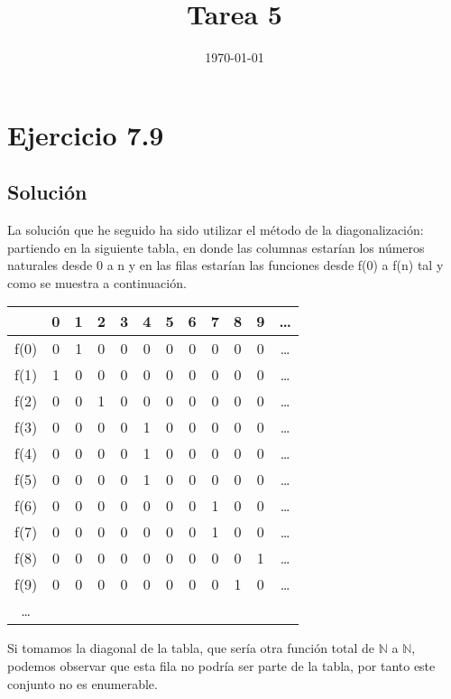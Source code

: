 \documentclass[11pt, a4paper, titlepage]{article}
\begin{document}
\title{Tarea 5}
\date{\today}
\maketitle
\newpage

\section*{Ejercicio 7.9}
\subsection*{Solución}
La solución que he seguido ha sido utilizar el método de la diagonalización:
partiendo en la siguiente tabla, en donde las columnas estarían los números
naturales desde 0 a n y en las filas estarían las funciones desde f(0) a f(n)
tal y como se muestra a continuación.

\begin{center}
  \begin{tabular}{| c | c c c c c c c c c c c|}
    \hline
    \, & 0 & 1 & 2 & 3 & 4 & 5 & 6 & 7 & 8 & 9 & \ldots \\ \hline
    f(0) & 0 & 1 & 0 & 0 & 0 & 0 & 0 & 0 & 0 & 0 & \ldots \\ \hline
    f(1) & 1 & 0 & 0 & 0 & 0 & 0 & 0 & 0 & 0 & 0 & \ldots \\ \hline
    f(2) & 0 & 0 & 1 & 0 & 0 & 0 & 0 & 0 & 0 & 0 & \ldots \\ \hline
    f(3) & 0 & 0 & 0 & 0 & 1 & 0 & 0 & 0 & 0 & 0 & \ldots \\ \hline
    f(4) & 0 & 0 & 0 & 0 & 1 & 0 & 0 & 0 & 0 & 0 & \ldots \\ \hline
    f(5) & 0 & 0 & 0 & 0 & 1 & 0 & 0 & 0 & 0 & 0 & \ldots \\ \hline
    f(6) & 0 & 0 & 0 & 0 & 0 & 0 & 0 & 1 & 0 & 0 & \ldots \\ \hline
    f(7) & 0 & 0 & 0 & 0 & 0 & 0 & 0 & 1 & 0 & 0 & \ldots \\ \hline
    f(8) & 0 & 0 & 0 & 0 & 0 & 0 & 0 & 0 & 0 & 1 & \ldots \\ \hline
    f(9) & 0 & 0 & 0 & 0 & 0 & 0 & 0 & 0 & 1 & 0 & \ldots \\ \hline
    \ldots
    
  \end{tabular}
\end{center}

Si tomamos la diagonal de la tabla, que sería otra función total de $\mathbb{N}$ a
$\mathbb{N}$, podemos observar que esta fila no podría ser parte de la tabla,
por tanto este conjunto no es enumerable.
\end{document}
